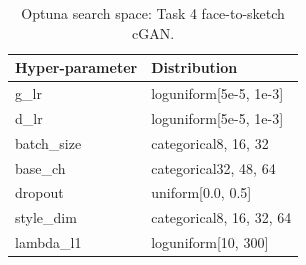 \begin{table}[t]
\centering
\caption{Optuna search space: Task 4 face-to-sketch cGAN.}
\label{tab:optuna_gan_space}
\footnotesize
\begin{tabular}{ll}
\toprule
Hyper-parameter & Distribution \\
\midrule
g\_lr & loguniform[5e-5, 1e-3] \\
d\_lr & loguniform[5e-5, 1e-3] \\
batch\_size & categorical{8, 16, 32} \\
base\_ch & categorical{32, 48, 64} \\
dropout & uniform[0.0, 0.5] \\
style\_dim & categorical{8, 16, 32, 64} \\
lambda\_l1 & loguniform[10, 300] \\
\bottomrule
\end{tabular}
\end{table}
